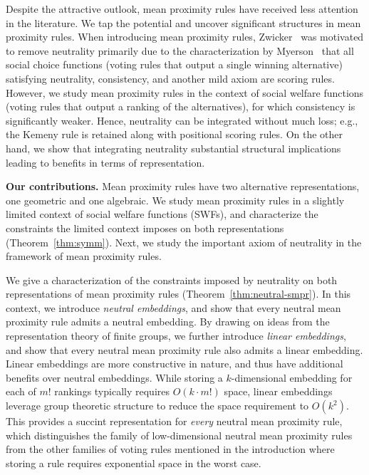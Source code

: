 \documentclass[prodmode]{acmsmall-ec14}
\begin{document}
Despite the attractive outlook, mean proximity rules have received less attention in the literature. We tap the potential and uncover significant structures in mean proximity rules. When introducing mean proximity rules, Zwicker~ was motivated to remove neutrality primarily due to the characterization by Myerson~ that all social choice functions (voting rules that output a single winning alternative) satisfying neutrality, consistency, and another mild axiom are scoring rules. However, we study mean proximity rules in the context of social welfare functions (voting rules that output a ranking of the alternatives), for which consistency is significantly weaker. Hence, neutrality can be integrated without much loss; e.g., the Kemeny rule is retained along with positional scoring rules. On the other hand, we show that integrating neutrality substantial structural implications leading to benefits in terms of representation. %

\noindent \textbf{Our contributions.} Mean proximity rules have two alternative representations, one geometric and one algebraic. We study mean proximity rules in a slightly limited context of social welfare functions (SWFs), and characterize the constraints the limited context imposes on both representations (Theorem~\ref{thm:symm}). Next, we study the important axiom of neutrality in the framework of mean proximity rules. 

We give a characterization of the constraints imposed by neutrality on both representations of mean proximity rules (Theorem~\ref{thm:neutral-smpr}). In this context, we introduce \emph{neutral embeddings}, and show that every neutral mean proximity rule admits a neutral embedding. By drawing on ideas from the representation theory of finite groups, we further introduce \emph{linear embeddings}, and show that every neutral mean proximity rule also admits a linear embedding. Linear embeddings are more constructive in nature, and thus have additional benefits over neutral embeddings. While storing a $k$-dimensional embedding for each of $m!$ rankings typically requires $O(k \cdot m!)$ space, linear embeddings leverage group theoretic structure to reduce the space requirement to $O(k^2)$. This provides a succint representation for \emph{every} neutral mean proximity rule, which distinguishes the family of low-dimensional neutral mean proximity rules from the other families of voting rules mentioned in the introduction where storing a rule requires exponential space in the worst case. 
\end{document}
